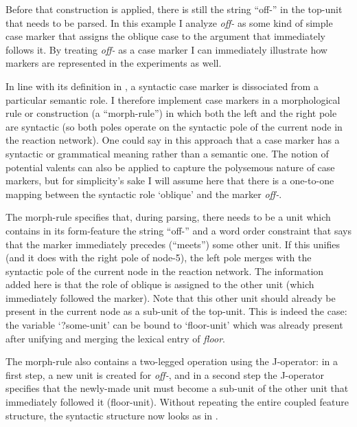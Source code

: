Before that construction is applied, there is still the string ``off-'' in the top-unit that needs to be parsed. In this example I analyze {\em off-} as some kind of simple case marker that assigns the oblique case to the argument that immediately follows it. By treating {\em off-} as a case marker I can immediately illustrate how markers are represented in the experiments as well.

In line with its definition in , a syntactic case marker is dissociated from a particular semantic role. I therefore implement case markers in a morphological rule or construction (a ``morph-rule'') in which both the left and the right pole are syntactic (so both poles operate on the syntactic pole of the current node in the reaction network). One could say in this approach that a case marker has a syntactic or grammatical meaning rather than a semantic one. The notion of potential valents can also be applied to capture the polysemous nature of case markers, but for simplicity's sake I will assume here that there is a one-to-one mapping between the syntactic role `oblique' and the marker {\em off-}.

The morph-rule specifies that, during parsing, there needs to be a unit which contains in its form-feature the string ``off-'' and a word order constraint that says that the marker immediately precedes (``meets'') some other unit. If this unifies (and it does with the right pole of node-5), the left pole merges with the syntactic pole of the current node in the reaction network. The information added here is that the role of oblique is assigned to the other unit (which immediately followed the marker). Note that this other unit should already be present in the current node as a sub-unit of the top-unit. This is indeed the case: the variable `?some-unit' can be bound to `floor-unit' which was already present after unifying and merging the lexical entry of {\em floor}.

The morph-rule also contains a two-legged operation using the J-operator: in a first step, a new unit is created for {\em off-}, and in a second step the J-operator specifies that the newly-made unit must become a sub-unit of the other unit that immediately followed it (floor-unit). Without repeating the entire coupled feature structure, the syntactic structure now looks as in .

